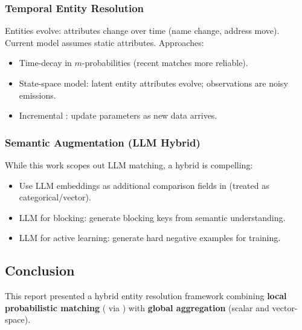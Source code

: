 \subsubsection{Temporal Entity Resolution}
\label{sec:future_temporal}
Entities evolve: attributes change over time (name change, address move). Current model assumes static attributes.
Approaches:
\begin{itemize}
	\item Time-decay in $m$-probabilities (recent matches more reliable).
	\item State-space model: latent entity attributes evolve; observations are noisy emissions.
	\item Incremental \emalgo{}: update parameters as new data arrives.
\end{itemize}

\subsubsection{Semantic Augmentation (LLM Hybrid)}
\label{sec:future_llm}
While this work scopes out LLM matching, a hybrid is compelling:
\begin{itemize}
	\item Use LLM embeddings as additional comparison fields in \splink{} (treated as categorical/vector).
	\item LLM for blocking: generate blocking keys from semantic understanding.
	\item LLM for active learning: generate hard negative examples for training.
\end{itemize}

\subsection{Conclusion}
\label{sec:conclusion_final}

This report presented a hybrid entity resolution framework combining \textbf{local probabilistic matching} (\fellegisunter{} via \splink{}) with \textbf{global aggregation} (scalar and vector-space).

